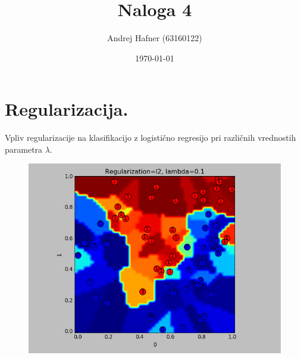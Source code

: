 \documentclass[a4paper,11pt]{article}
\title{Naloga 4}
\author{Andrej Hafner (63160122)}
\date{\today}
\begin{document}
\maketitle


\normalfont\textsl{}
\section{Regularizacija.}Vpliv regularizacije na klasifikacijo z logistično regresijo pri različnih vrednostih parametra $\lambda$. 
\begin{figure}%
	
	\centering
	
	\qquad


\end{figure}
\begin{figure}[!htb]
\centering
\includegraphics[clip,scale=0.35]{myplot4}
\end{figure}
\pagebreak
\end{document}
